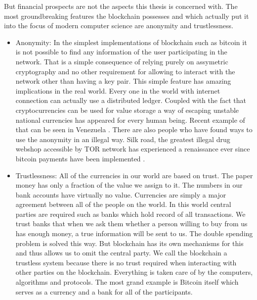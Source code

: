 \documentclass[a4paper,12pt,twoside,openany]{report}
\begin{document}
But financial prospects are not the aspects this thesis is concerned with. The most groundbreaking features the blockchain possesses and which actually put it into the focus of modern computer science are anonymity and trustlessness.
\newpage
\begin{itemize}
\item Anonymity: In the simplest implementations of blockchain such as bitcoin it is not possible to find any information of the user participating in the network. That is a simple consequence of relying purely on assymetric cryptography and no other requirement for allowing to interact with the network other than having a key pair. This simple feature has amazing implications in the real world. Every one in the world with internet connection can actually use a distributed ledger. Coupled with the fact that cryptocurrencies can be used for value storage a way of escaping unstable national currencies has appeared for every human being. Recent example of that can be seen in Venezuela \cite{Venezuela}. There are also people who have found ways to use the anonymity in an illegal way. Silk road, the greatest illegal drug webshop accessible by TOR network has experienced a renaissance ever since bitcoin payments have been implemented \cite{Silkroad}. 

\item Trustlessness: All of the currencies in our world are based on trust. The paper money has only a fraction of the value we assign to it. The numbers in our bank accounts have virtually no value. Currencies are simply a major agreement between all of the people on the world. In this world central parties are required such as banks which hold record of all transactions. We trust banks that when we ask them whether a person willing to buy from us has enough money, a true information will be sent to us. The double spending problem is solved this way. But blockchain has its own mechanisms for this and thus allows us to omit the central party. We call the blockchain a trustless system because there is no trust required when interacting with other parties on the blockchain. Everything is taken care of by the computers, algorithms and protocols. The most grand example is Bitcoin itself which serves as a currency and a bank for all of the participants.
\end{itemize}
\end{document}

